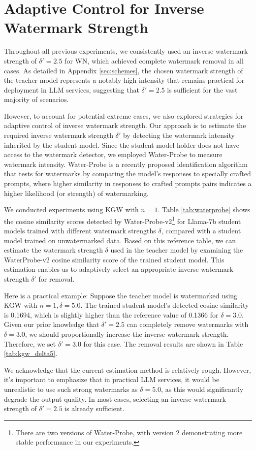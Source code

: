 \section{Adaptive Control for Inverse Watermark Strength}
\label{sec:adaptive}
Throughout all previous experiments, we consistently used an inverse watermark strength of $\delta'=2.5$ for WN, which achieved complete watermark removal in all cases. As detailed in Appendix \ref{sec:schemes}, the chosen watermark strength of the teacher model represents a notably high intensity that remains practical for deployment in LLM services, suggesting that $\delta'=2.5$ is sufficient for the vast majority of scenarios.

However, to account for potential extreme cases, we also explored strategies for adaptive control of inverse watermark strength. Our approach is to estimate the required inverse watermark strength $\delta'$ by detecting the watermark intensity inherited by the student model. Since the student model holder does not have access to the watermark detector, we employed Water-Probe \cite{liu2024can} to measure watermark intensity. Water-Probe is a recently proposed identification algorithm that tests for watermarks by comparing the model's responses to specially crafted prompts, where higher similarity in responses to crafted prompts pairs indicates a higher likelihood (or strength) of watermarking.

We conducted experiments using KGW with $n=1$. Table \ref{tab:waterprobe} shows the cosine similarity scores detected by Water-Probe-v2\footnote{There are two versions of Water-Probe, with version 2 demonstrating more stable performance in our experiments.} for Llama-7b student models trained with different watermark strengths $\delta$, compared with a student model trained on unwatermarked data. Based on this reference table, we can estimate the watermark strength $\delta$ used in the teacher model by examining the WaterProbe-v2 cosine similarity score of the trained student model. This estimation enables us to adaptively select an appropriate inverse watermark strength $\delta'$ for removal. 

Here is a practical example: Suppose the teacher model is watermarked using KGW with $n=1, \delta=5.0$. The trained student model's detected cosine similarity is 0.1694, which is slightly higher than the reference value of 0.1366 for $\delta=3.0$. Given our prior knowledge that $\delta'=2.5$ can completely remove watermarks with $\delta=3.0$, we should proportionally increase the inverse watermark strength. Therefore, we set $\delta'=3.0$ for this case. The removal results are shown in Table \ref{tab:kgw_delta5}.




We acknowledge that the current estimation method is relatively rough. However, it's important to emphasize that in practical LLM services, it would be unrealistic to use such strong watermarks as $\delta=5.0$, as this would significantly degrade the output quality. In most cases, selecting an inverse watermark strength of $\delta'=2.5$ is already sufficient.